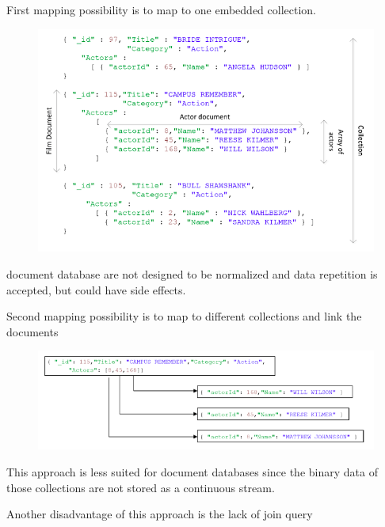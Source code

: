 \documentclass{beamer}
\begin{document}
\begin{slide}{
	\item First mapping possibility is to map to one embedded collection.
\begin{figure}
		\includegraphics[scale=0.23]{img/mongo-embeded}
\end{figure}
 \item document database are not designed to be normalized and data repetition is accepted, but could have side effects.   
}\end{slide}


\begin{slide}{
	\item Second mapping possibility is to map to different collections and link the documents
\begin{figure}
		\includegraphics[scale=0.3]{img/mongo-linked}
\end{figure}
\item This approach is less suited for document databases since the binary data of those collections are not stored as a continuous stream.
\item Another disadvantage of this approach is the lack of join query
}\end{slide}
\end{document}
